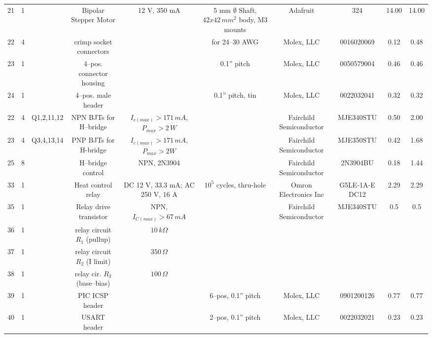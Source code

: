 \documentclass[10pt, twocolumn]{article}
\begin{document}
\begin{center}
\begin{adjustbox}{max width=\textwidth}
\begin{tabular}{c c c c c c c c c c}
21	&1	&	&Bipolar Stepper Motor	&12 V, 350 mA		&5 mm $\emptyset$ Shaft, $42x42\,mm^{2}$ body, M3 mounts
	&Adafruit		&324			&14.00		&14.00	\\

22	&4	&	&crimp socket connectors	&			&for 24--30 AWG
	&Molex, LLC		&0016020069		&0.12		&0.48	\\

23	&1	&	&4--pos. connector housing	&			&0.1'' pitch
	&Molex, LLC		&0050579004		&0.46		&0.46	\\

24	&1	&	&4--pos. male header	&				&0.1'' pitch, tin
	&Molex, LLC		&0022032041		&0.32		&0.32	\\

22	&4	&Q1,2,11,12	&NPN BJTs for H--bridge	&$I_{c(max)}>171\,mA$, $P_{max}>2\,W$	&
	&Fairchild Semiconductor	&MJE340STU	&0.50		&2.00	\\

23	&4	&Q3,4,13,14	&PNP BJTs for H-bridge	&$I_{c(max)}>171\,mA$, $P_{max}>2W$	&
	&Fairchild Semiconductor	&MJE350STU	&0.42		&1.68	\\

25	&8	&	&H--bridge control	&NPN, 2N3904			&
	&Fairchild Semiconductor	&2N3904BU	&0.18		&1.44	\\

33	&1	&	&Heat control relay		&DC 12 V, 33.3 mA; AC 250 V, 16 A	&$10^5$ cycles, thru-hole
	&Omron Electronics Inc	&G5LE-1A-E DC12		&2.29		&2.29	\\

35	&1	&	&Relay drive transistor		&NPN, $I_{C(max)}>67\,mA$		&
	&Fairchild Semiconductor	&MJE340STU	&0.5		&0.5	\\

36	&1	&	&relay circuit $R_{1}$ (pullup)	&$10\,k\Omega$				&
	&				&		&		&	\\

37	&1	&	&relay circuit $R_{2}$ (I limit)	&$350\,\Omega$			&
	&				&		&		&	\\

38	&1	&	&relay cir. $R_{3}$ (base--bias)	&$100\,\Omega$			&
	&				&		&		&	\\

39	&1	&	&PIC ICSP header		&				&6--pos, 0.1” pitch
	&Molex, LLC	&0901200126			&0.77		&0.77	\\

40	&1	&	&USART header			&				&2--pos, 0.1” pitch
	&Molex, LLC	&0022032021			&0.23		&0.23	\\

\hline\hline
\end{tabular}
\end{adjustbox}
\label{digikey-bill-of-materials}
\end{center}
\end{document}
